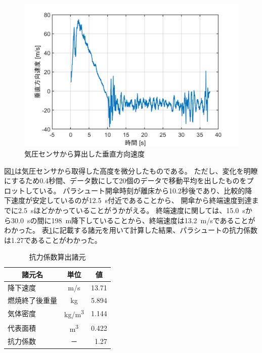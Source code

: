\documentclass[a4paper,11pt,uplatex]{jsarticle}
\begin{document}
\begin{figure}[H]
	\centering
	\includegraphics[width=0.7\linewidth]{pic_sim/hight_d.png}
	\caption{気圧センサから算出した垂直方向速度}
	\label{fig:suityoku_kiatu}
\end{figure}

図\ref{fig:suityoku_kiatu}は気圧センサから取得した高度を微分したものである。
ただし、変化を明瞭にするため0.4秒間、データ数にして20個のデータで移動平均を出したものをプロットしている。
パラシュート開傘時刻が離床から10.2秒後であり、比較的降下速度が安定しているのが\SI{12.5}{s}付近であることから、
開傘から終端速度到達までに\SI{2.5}{s}ほどかかっていることがうかがえる。
終端速度に関しては、\SI{15.0}{s}から\SI{30.0}{s}の間に\SI{198}{m}降下していることから、終端速度は\SI{13.2}{m/s}であることがわかった。
表\ref{tab:kouryoku_shogen}に記載する諸元を用いて計算した結果、パラシュートの抗力係数は1.27であることがわかった。

\begin{table}[H]
	\centering
	\caption{抗力係数算出諸元}
	\label{tab:kouryoku_shogen}
	\begin{tabular}{lcr}
		\toprule
		\multicolumn{1}{c}{諸元名} & 単位          & \multicolumn{1}{c}{値} \\
		\midrule
		降下速度                    & \si{m/s}    & 13.71                 \\
		燃焼終了後重量                 & \si{kg}     & 5.894                 \\
		気体密度                    & \si{kg/m^3} & 1.144                 \\
		代表面積                    & \si{m^3}    & 0.422                 \\
		\midrule
		抗力係数                    & －           & 1.27                  \\
		\bottomrule
	\end{tabular}
\end{table}
\end{document}
